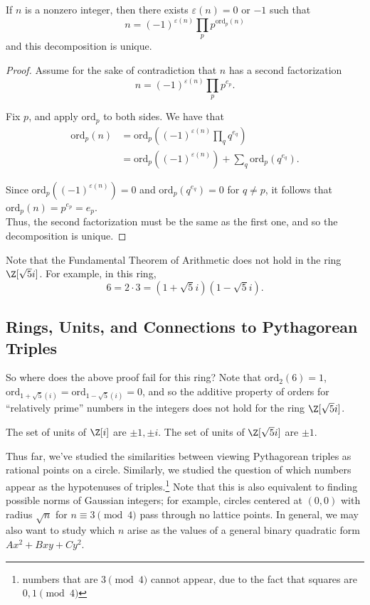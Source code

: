 \documentclass[11pt]{article}
\begin{document}
\begin{theorem}
If $n$ is a nonzero integer, then there exists $\varepsilon(n) = 0$ or $-1$ such that
\[
    n = (-1)^{\varepsilon(n)} \prod_p p^{\mathrm{ord}_p(n)}
\]
and this decomposition is unique.
\end{theorem}

\begin{proof}
Assume for the sake of contradiction that $n$ has a second factorization
\[
    n = (-1)^{\varepsilon(n)} \prod_{p} p^{e_p}.
\]

Fix $p$, and apply $\mathrm{ord}_p$ to both sides. We have that
\begin{align*}
    \mathrm{ord}_p(n) &= \mathrm{ord}_p \left( (-1)^{\varepsilon(n)} \prod_{q} q^{e_q} \right) \\
    &= \mathrm{ord}_p \left( (-1)^{\varepsilon(n)} \right) + \sum_q \mathrm{ord}_p(q^{e_q}). 
\end{align*}

Since $\mathrm{ord}_p \left( (-1)^{\varepsilon(n)} \right) = 0$ and $\mathrm{ord}_p(q^{e_q}) = 0$ for $q \neq p$, it follows that
$\mathrm{ord}_p(n) = p^{e_p} = e_p$. \\

Thus, the second factorization must be the same as the first one, and so the decomposition is unique.
\end{proof}

Note that the Fundamental Theorem of Arithmetic does not hold in the ring $\Z[\sqrt{5}i]$. For example, in this ring,
\[
    6 = 2\cdot 3 = (1+\sqrt{5}i)(1-\sqrt{5}i).
\]

\subsection{Rings, Units, and Connections to Pythagorean Triples}

So where does the above proof fail for this ring? Note that $\mathrm{ord}_2(6) = 1$, $\mathrm{ord}_{1+\sqrt{5}(i)} = \mathrm{ord}_{1-\sqrt{5}(i)} = 0$,
and so the additive property of orders for ``relatively prime'' numbers in the integers does not hold for the ring $\Z[\sqrt{5}i]$. 

\begin{exercise}
The set of units of $\Z[i]$ are $\pm 1, \pm i$.
The set of units of $\Z[\sqrt{5}i]$ are $\pm 1$.
\end{exercise}

Thus far, we've studied the similarities between viewing Pythagorean triples as rational points on a circle. Similarly, we
studied the question of which numbers appear as the hypotenuses of triples.\footnote{numbers that are $3 \pmod 4$ cannot appear, due to the fact that squares are $0, 1 \pmod {4}$}
Note that this is also equivalent to finding possible norms of Gaussian integers; for example, circles centered at $(0, 0)$ with radius $\sqrt{n}$ for $n \equiv 3 \pmod 4$ pass through no lattice points.
In general, we may also want to study which $n$ arise as the values of a general binary quadratic form $Ax^2 + Bxy + Cy^2$.
\end{document}
